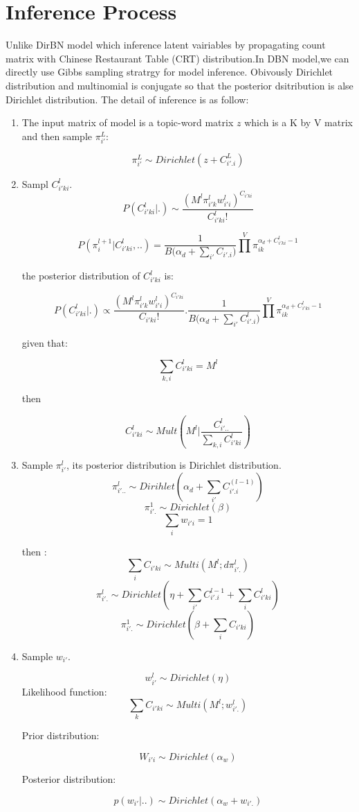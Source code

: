 \section{Inference Process}
Unlike DirBN model which inference latent vairiables by propagating count matrix with Chinese Restaurant Table (CRT) distribution.In DBN model,we can directly use Gibbs sampling stratrgy for model inference. Obivously Dirichlet distribution and multinomial is conjugate so that the posterior dsitribution is alse Dirichlet distribution. The detail of inference is as follow:
\begin{enumerate}
  \item The input matrix of model is a topic-word matrix  $z$ which is a K by V matrix and then sample $\pi_{i'}^{L}$:

  $$\pi_{i'}^{L} \sim Dirichlet(z + C_{i'.i}^L)$$

  \item Sampl $C_{i'ki}^l$.
  $$P(C_{i'ki}^{l}|.) \sim \frac{(M^l \pi_{i'k}^l w_{i'i}^l)^{C_{i'ki}}}{C_{i'ki}^{l}!}$$

  $$P(\pi_i^{l+1}|C_{i'ki}^{l},..) = \frac{1}{B({\alpha_d +\sum_{i'}{C_{i'.i})}}} \prod^V \pi_{ik}^{\alpha_d+C_{i'ki}^l-1}$$

  the posterior distribution of $C_{i'ki}^{l}$ is:

  $$P(C_{i'ki}^{l}|.) \propto \frac{(M^l \pi_{i'k}^l w_{i'i}^l)^{C_{i'ki}}}{C_{i'ki}!} .\frac{1}{B({\alpha_d +\sum_{i'}{C_{i'.i}^{l})}}} \prod^V \pi_{ik}^{\alpha_d+C_{i'ki}^l-1} $$

  given that:

  $$\sum_{k,i}{C_{i'ki}^l} = M^l$$

  then

 $$
    {C_{i'ki}^l} \sim Mult(M^{l} | \frac{C_{i'..}^{l}}{\sum_{k,i} C_{i'ki}^{l}})
 $$


  \item Sample $\pi_{i'}^l$, its posterior distribution is Dirichlet distribution.
  \[
    \pi_{i'..}^l \sim Dirihlet(\alpha_d +\sum_{i'}{C_{i'.i}^{(l-1)}})
  \]
  $$ \pi_{i'.}^1 \sim Dirichlet(\beta) $$
  \[
    \sum_i w_{i'i} = 1
  \]

  then :
    $$\sum_i{C_{i'ki}} \sim Multi(M^l;d\pi_{i'.}^l)$$
    $$
     \pi_{i'.}^l \sim Dirichlet(\eta + \sum_{i'} C_{i'.i}^{l-1} + \sum_i{C_{i'ki}^l})
    $$
    $$
     \pi_{i'.}^1 \sim Dirichlet(\beta +  \sum_i{C_{i'ki}})
    $$

  \item  Sample $w_{i'}$.

  \[
    w_{i'}^l \sim Dirichlet(\eta)
  \]
  Likelihood function:
  $$\sum_k{C_{i'ki}} \sim Multi(M^l;w_{i'.}^l)$$

  Prior distribution:

  $$W_{i'i} \sim Dirichlet(\alpha_w)$$

  Posterior distribution:

  $$p(w_{i'}|..) \sim Dirichlet(\alpha_w+w_{i'.})$$
\end{enumerate}

